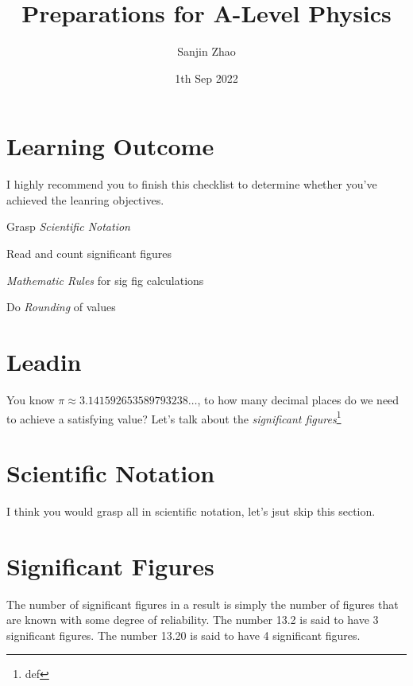 \documentclass[a4paper]{tufte-handout}
\title{Preparations for A-Level Physics}
\author{Sanjin Zhao}
\date{1th Sep 2022}  %
\begin{document}
\maketitle%

\section*{Learning Outcome}
I highly recommend you to finish this checklist to determine whether you've achieved the leanring objectives.
\begin{todolist}
	\item Grasp \emph{Scientific Notation}
	\item Read and count significant figures
	\item \emph{Mathematic Rules} for sig fig calculations
	\item Do \emph{Rounding} of values
\end{todolist}
\clearpage

\section*{Leadin}
You know $\pi \approx 3.141592653589793238\ldots$, to how many decimal places do we need to achieve a satisfying value? Let's talk about the \emph{significant figures}\footnote{def}

\section{Scientific Notation}
I think you would grasp all in scientific notation, let's jsut skip this section. 

\section{Significant Figures}
The number of significant figures in a result is simply the number of ﬁgures that are known with some degree of reliability. The number 13.2 is said to have 3 significant figures. The number 13.20 is said to have 4 significant figures.
\end{document}
